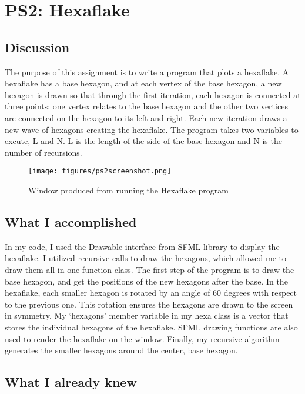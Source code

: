 \section{PS2: Hexaflake}\label{sec:ps2}

\subsection{Discussion}\label{sec:ps2:disc}

The purpose of this assignment is to write a program that plots a hexaflake. A hexaflake has a base hexagon, and at each vertex of the base hexagon, a new hexagon is drawn so that through the first iteration, each hexagon is connected at three points: one vertex relates to the base hexagon and the other two vertices are connected on the hexagon to its left and right. Each new iteration draws a new wave of hexagons creating the hexaflake. The program takes two variables to excute, L and N. L is the length of the side of the base hexagon and N is the number of recursions.

\begin{figure}[tbh]
	\centering
	\texttt{[image: figures/ps2screenshot.png]}
	\caption{Window produced from running the Hexaflake program}\label{fig:ps2ss}
\end{figure}


\subsection{What I accomplished}\label{sec:ps2:accomplish}

In my code, I used the Drawable interface from SFML library to display the hexaflake. I utilized recursive calls to draw the hexagons, which allowed me to draw them all in one function class. The first step of the program is to draw the base hexagon, and get the positions of the new hexagons after the base. In the hexaflake, each smaller hexagon is rotated by an angle of 60 degrees with respect to the previous one. This rotation ensures the hexagons are drawn to the screen in symmetry. My ‘hexagons’ member variable in my hexa class is a vector that stores the individual hexagons of the hexaflake. SFML drawing functions are also used to render the hexaflake on the window. Finally, my recursive algorithm generates the smaller hexagons around the center, base hexagon.

\subsection{What I already knew}\label{sec:ps2:knew}

